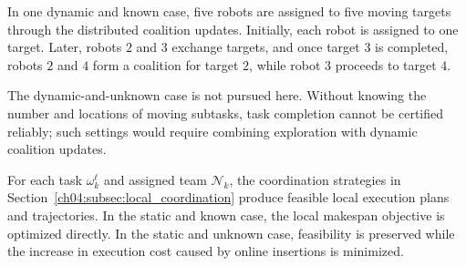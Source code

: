 \begin{example}
\label{ch04:example:DynamicKnown}
In one dynamic and known
case, five robots are assigned to five moving targets through the distributed
coalition updates. Initially, each
robot is assigned to one target. Later, robots $2$ and $3$ exchange targets,
and once target $3$ is completed, robots $2$ and $4$ form a coalition for
target $2$, while robot $3$ proceeds to target $4$.
\end{example}

The dynamic-and-unknown case is not pursued here. Without knowing the number and
locations of moving subtasks, task completion cannot be certified reliably; such
settings would require combining exploration with dynamic coalition updates.


\begin{theorem}
\label{ch04:thm:local-correctness}
For each task $\omega_k^\ell$ and assigned team $\mathcal{N}_k$, the
coordination strategies in Section~\ref{ch04:subsec:local_coordination}
produce feasible local execution plans and trajectories. In the static and
known case, the local makespan objective is optimized directly. In the static
and unknown case, feasibility is preserved while the increase in execution cost
caused by online insertions is minimized. 
\end{theorem}

